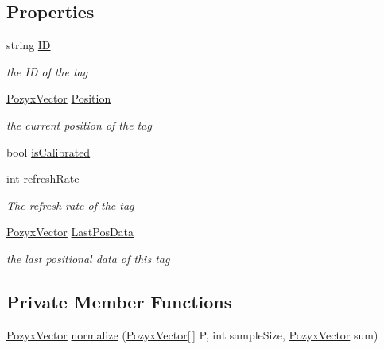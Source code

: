 \subsection*{Properties}
\begin{DoxyCompactItemize}
\item 
string \hyperlink{class_pozyx_subscriber_1_1_framework_1_1_tag_a0452cd07da18e2f11ca7f3e14831f94a}{ID}
\begin{DoxyCompactList}\small\item\em the ID of the tag \end{DoxyCompactList}\item 
\hyperlink{struct_pozyx_subscriber_1_1_framework_1_1_pozyx_vector}{Pozyx\+Vector} \hyperlink{class_pozyx_subscriber_1_1_framework_1_1_tag_a74a78a7dddc3e41bbb1b8dcdc4d2077e}{Position}
\begin{DoxyCompactList}\small\item\em the current position of the tag \end{DoxyCompactList}\item 
bool \hyperlink{class_pozyx_subscriber_1_1_framework_1_1_tag_aaf8eae6b4234cd24e9aa7ec97cd7f21f}{is\+Calibrated}
\item 
int \hyperlink{class_pozyx_subscriber_1_1_framework_1_1_tag_aa577a04657d16985adfd75898003324d}{refresh\+Rate}
\begin{DoxyCompactList}\small\item\em The refresh rate of the tag \end{DoxyCompactList}\item 
\hyperlink{struct_pozyx_subscriber_1_1_framework_1_1_pozyx_vector}{Pozyx\+Vector} \hyperlink{class_pozyx_subscriber_1_1_framework_1_1_tag_a174d82951696d1da13ec68f003f98bcf}{Last\+Pos\+Data}
\begin{DoxyCompactList}\small\item\em the last positional data of this tag \end{DoxyCompactList}\end{DoxyCompactItemize}
\subsection*{Private Member Functions}
\begin{DoxyCompactItemize}
\item 
\hyperlink{struct_pozyx_subscriber_1_1_framework_1_1_pozyx_vector}{Pozyx\+Vector} \hyperlink{class_pozyx_subscriber_1_1_framework_1_1_tag_a937d43773dc3cbfa6a227fd933d015bd}{normalize} (\hyperlink{struct_pozyx_subscriber_1_1_framework_1_1_pozyx_vector}{Pozyx\+Vector}\mbox{[}$\,$\mbox{]} P, int sample\+Size, \hyperlink{struct_pozyx_subscriber_1_1_framework_1_1_pozyx_vector}{Pozyx\+Vector} sum)
\end{DoxyCompactItemize}
